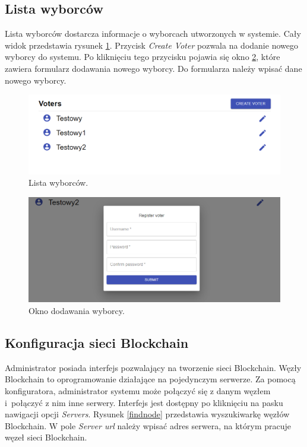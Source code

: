 \documentclass[a4paper,12pt]{book}
\begin{document}
\subsection{Lista wyborców}

Lista wyborców dostarcza informacje o wyborcach utworzonych w systemie. Cały widok przedstawia rysunek \ref{voterslist}. Przycisk \textit{Create Voter} pozwala na dodanie nowego wyborcy do systemu. Po kliknięciu tego przycisku pojawia się okno \ref{addvoter}, które zawiera formularz dodawania nowego wyborcy. Do formularza należy wpisać dane nowego wyborcy.

\begin{figure}[h]
	\centering
	\includegraphics[width=\textwidth]{images/voterslist.png}
	\caption{Lista wyborców.}\label{voterslist}
\end {figure}

\begin{figure}[h]
	\centering
	\includegraphics[width=\textwidth]{images/addvoter.png}
	\caption{Okno dodawania wyborcy.}\label{addvoter}
\end {figure}

\newpage

\subsection{Konfiguracja sieci Blockchain}

Administrator posiada interfejs pozwalający na tworzenie sieci Blockchain. Węzły Blockchain to oprogramowanie działające na pojedynczym serwerze. Za pomocą konfiguratora, administrator systemu może połączyć się z danym węzłem i~połączyć z nim inne serwery. Interfejs jest dostępny po kliknięciu na pasku nawigacji opcji \textit{Servers}. Rysunek \ref{findnode} przedstawia wyszukiwarkę węzłów Blockchain. W pole \textit{Server url} należy wpisać adres serwera, na którym pracuje węzeł sieci Blockchain.
\end{document}
